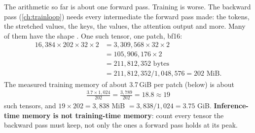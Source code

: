 The arithmetic so far is about one forward pass. Training is worse. The backward pass (\cref{ch:trainloop}) needs every intermediate the forward pass made: the tokens, the stretched values, the keys, the values, the attention output and more. Many of them have the shape . One such tensor, one patch, bf16:
\begin{align*}
  16{,}384\times202\times32\times2 &= 3{,}309{,}568\times32\times2\\
  &= 105{,}906{,}176\times2\\
  &= 211{,}812{,}352 \text{ bytes}\\
  &= 211{,}812{,}352/1{,}048{,}576 = 202 \text{ MiB}.
\end{align*}
The measured training memory of about 3.7\,GiB per patch (below) is about
\begin{align*}
  \frac{3.7\times1{,}024}{202} = \frac{3{,}789}{202} = 18.8 \approx 19
\end{align*}
such tensors, and $19\times202 = 3{,}838$ MiB $= 3{,}838/1{,}024 = 3.75$ GiB. \textbf{Inference-time memory is not training-time memory}: count every tensor the backward pass must keep, not only the ones a forward pass holds at its peak.



